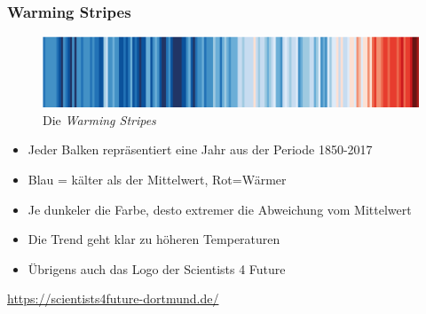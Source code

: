 

\begin{frame}
	\frametitle{Warming Stripes}

	\begin{figure}
		\centering
		\includegraphics[width=\linewidth]{bilder/s4f-warming-stripes}
		\caption{Die \textit{Warming Stripes}}
		\label{fig:s4f-warming-stripes}
	\end{figure}
	\begin{itemize}
		\item Jeder Balken repräsentiert eine Jahr aus der Periode 1850-2017
		\item Blau = kälter als der Mittelwert, Rot=Wärmer
		\item Je dunkeler die Farbe, desto extremer die Abweichung vom Mittelwert
		\item Die Trend geht klar zu höheren Temperaturen
		\item Übrigens auch das Logo der Scientists 4 Future
	\end{itemize}
	\begin{center}
		\url{https://scientists4future-dortmund.de/}
	\end{center}

\end{frame}

